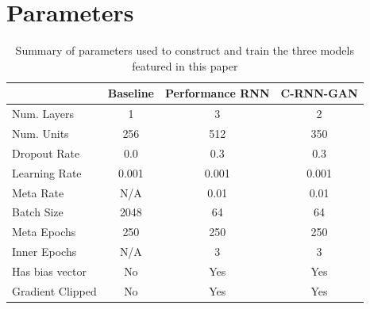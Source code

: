 \documentclass[a4paper]{book}
\begin{document}
\chapter{Parameters} \label{appendix:parameters}

\begin{table}[h]
    \centering
    \begin{tabular}{l|c|c|c}
                    &\bf Baseline   &\bf Performance RNN&\bf C-RNN-GAN  \\ \hline
    Num. Layers     &   1           &   3               &   2           \\
    Num. Units      &   256         &   512             &   350         \\
    Dropout Rate    &   0.0         &   0.3             &   0.3         \\
    Learning Rate   &   0.001       &   0.001           &   0.001       \\
    Meta Rate       &   N/A         &   0.01            &   0.01        \\
    Batch Size      &   2048        &   64              &   64          \\
    Meta Epochs     &   250         &   250             &   250         \\
    Inner Epochs    &   N/A         &   3               &   3           \\
    Has bias vector &   No          &   Yes             &   Yes         \\
    Gradient Clipped&   No          &   Yes             &   Yes         \\
    \end{tabular}
    \caption{Summary of parameters used to construct and train the three models featured in this paper}
    \label{tab:params}
\end{table}

\end{document}

